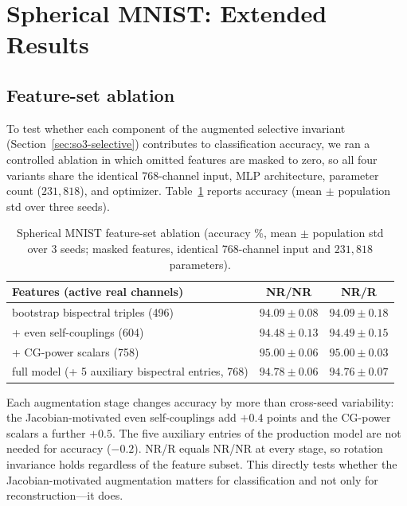 \documentclass{article}
\theoremstyle{definition}
\theoremstyle{remark}
\theoremstyle{definition}
\begin{document}
\section{Spherical MNIST: Extended Results}
\label{app:smnist-details}

\subsection{Feature-set ablation}

To test whether each component of the augmented selective invariant
(Section~\ref{sec:so3-selective}) contributes to classification
accuracy, we ran a controlled ablation in which omitted features are
masked to zero, so all four variants share the identical 768-channel
input, MLP architecture, parameter count ($231{,}818$), and
optimizer. Table~\ref{tab:smnist-ablation} reports accuracy
(mean $\pm$ population std over three seeds).

\begin{table}[h]
  \caption{Spherical MNIST feature-set ablation (accuracy \%,
    mean $\pm$ population std over 3 seeds; masked features, identical
    768-channel input and $231{,}818$ parameters).}
  \label{tab:smnist-ablation}
  \centering
  \small
  \begin{tabular}{lcc}
    \toprule
    Features (active real channels) & NR/NR & NR/R \\
    \midrule
    bootstrap bispectral triples (496) & $94.09 \pm 0.08$ & $94.09 \pm 0.18$ \\
    + even self-couplings (604)        & $94.48 \pm 0.13$ & $94.49 \pm 0.15$ \\
    + CG-power scalars (758)           & $95.00 \pm 0.06$ & $95.00 \pm 0.03$ \\
    full model (+ 5 auxiliary bispectral entries, 768)
                                       & $94.78 \pm 0.06$ & $94.76 \pm 0.07$ \\
    \bottomrule
  \end{tabular}
\end{table}

Each augmentation stage changes accuracy by more than cross-seed
variability: the Jacobian-motivated even self-couplings add $+0.4$
points and the CG-power scalars a further $+0.5$. The five auxiliary
entries of the production model are not needed for accuracy
($-0.2$). NR/R equals NR/NR at every stage, so rotation invariance
holds regardless of the feature subset. This directly tests whether
the Jacobian-motivated augmentation matters for classification and
not only for reconstruction---it does.
\end{document}
